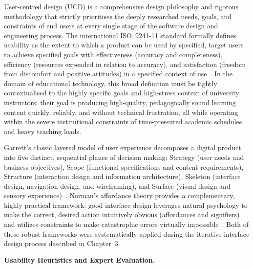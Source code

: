 User-centred design (UCD) is a comprehensive design philosophy and rigorous methodology that strictly prioritises the deeply researched needs, goals, and constraints of end users at every single stage of the software design and engineering process. The international ISO~9241-11 standard formally defines usability as the extent to which a product can be used by specified, target users to achieve specified goals with effectiveness (accuracy and completeness), efficiency (resources expended in relation to accuracy), and satisfaction (freedom from discomfort and positive attitudes) in a specified context of use~\cite{iso9241}. In the domain of educational technology, this broad definition must be tightly contextualised to the highly specific goals and high-stress context of university instructors: their goal is producing high-quality, pedagogically sound learning content quickly, reliably, and without technical frustration, all while operating within the severe institutional constraints of time-pressured academic schedules and heavy teaching loads.

Garrett's classic layered model of user experience decomposes a digital product into five distinct, sequential planes of decision making: Strategy (user needs and business objectives), Scope (functional specifications and content requirements), Structure (interaction design and information architecture), Skeleton (interface design, navigation design, and wireframing), and Surface (visual design and sensory experience)~\cite{garrett2010}. Norman's affordance theory provides a complementary, highly practical framework: good interface design leverages natural psychology to make the correct, desired action intuitively obvious (affordances and signifiers) and utilizes constraints to make catastrophic errors virtually impossible~\cite{norman1988}. Both of these robust frameworks were systematically applied during the iterative interface design process described in Chapter~3.

\textbf{Usability Heuristics and Expert Evaluation.}

